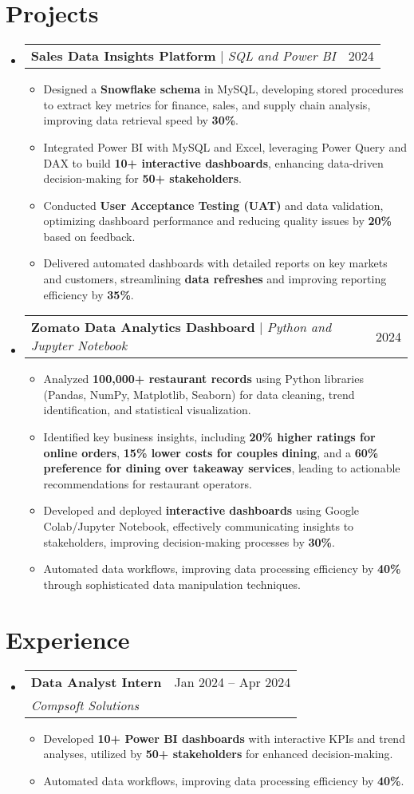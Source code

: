 \documentclass[letterpaper,11pt]{article}
\makeatletter
\newcommand{\resumeItem}[1]{
  \item\small{
    {#1 \vspace{-2pt}}
  }
}
\newcommand{\resumeSubheading}[4]{
  \vspace{-2pt}\item
    \begin{tabular*}{0.97\textwidth}[t]{l@{\extracolsep{\fill}}r}
      \textbf{#1} & #2 \\
      \textit{\small#3} & \textit{\small #4} \\
    \end{tabular*}\vspace{-7pt}
}
\newcommand{\resumeProjectHeading}[2]{
    \item
    \begin{tabular*}{0.97\textwidth}{l@{\extracolsep{\fill}}r}
      \small#1 & #2 \\
    \end{tabular*}\vspace{-7pt}
}
\newcommand{\resumeSubHeadingListStart}{\begin{itemize}[leftmargin=0.15in, label={}]}
\newcommand{\resumeSubHeadingListEnd}{\end{itemize}}
\newcommand{\resumeItemListStart}{\begin{itemize}}
\newcommand{\resumeItemListEnd}{\end{itemize}\vspace{-5pt}}
\makeatother
\begin{document}
\section{Projects}
\resumeSubHeadingListStart
  \resumeProjectHeading
    {\textbf{Sales Data Insights Platform} $|$ \textit{SQL and Power BI}}{2024}
    \resumeItemListStart
      \resumeItem{Designed a \textbf{Snowflake schema} in MySQL, developing stored procedures to extract key metrics for finance, sales, and supply chain analysis, improving data retrieval speed by \textbf{30\%}.}
      \resumeItem{Integrated Power BI with MySQL and Excel, leveraging Power Query and DAX to build \textbf{10+ interactive dashboards}, enhancing data-driven decision-making for \textbf{50+ stakeholders}.}
      \resumeItem{Conducted \textbf{User Acceptance Testing (UAT)} and data validation, optimizing dashboard performance and reducing quality issues by \textbf{20\%} based on feedback.}
      \resumeItem{Delivered automated dashboards with detailed reports on key markets and customers, streamlining \textbf{data refreshes} and improving reporting efficiency by \textbf{35\%}.}
    \resumeItemListEnd
  \resumeProjectHeading
    {\textbf{Zomato Data Analytics Dashboard} $|$ \textit{Python and Jupyter Notebook}}{2024}
    \resumeItemListStart
      \resumeItem{Analyzed \textbf{100,000+ restaurant records} using Python libraries (Pandas, NumPy, Matplotlib, Seaborn) for data cleaning, trend identification, and statistical visualization.}
      \resumeItem{Identified key business insights, including \textbf{20\% higher ratings for online orders}, \textbf{15\% lower costs for couples dining}, and a \textbf{60\% preference for dining over takeaway services}, leading to actionable recommendations for restaurant operators.}
      \resumeItem{Developed and deployed \textbf{interactive dashboards} using Google Colab/Jupyter Notebook, effectively communicating insights to stakeholders, improving decision-making processes by \textbf{30\%}.}
      \resumeItem{Automated data workflows, improving data processing efficiency by \textbf{40\%} through sophisticated data manipulation techniques.}
    \resumeItemListEnd
\resumeSubHeadingListEnd

\section{Experience}
\resumeSubHeadingListStart
  \resumeSubheading
    {Data Analyst Intern}{Jan 2024 -- Apr 2024}
    {Compsoft Solutions}{}
    \resumeItemListStart
      \resumeItem{Developed \textbf{10+ Power BI dashboards} with interactive KPIs and trend analyses, utilized by \textbf{50+ stakeholders} for enhanced decision-making.}
      \resumeItem{Automated data workflows, improving data processing efficiency by \textbf{40\%}.}
    \resumeItemListEnd
\resumeSubHeadingListEnd
\end{document}
